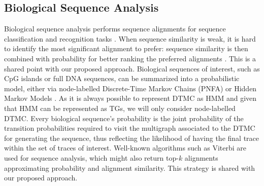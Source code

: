 

\subsection{Biological Sequence Analysis}
Biological sequence analysis performs sequence alignments for sequence classification and recognition tasks \cite{durbin1998biological}. When sequence similarity is weak, it is hard to identify the most significant alignment to prefer: sequence similarity is then combined with probability for better ranking the preferred alignments \cite{durbin1998biological}. This is a shared point with our proposed approach. 
%
Biological sequences of interest, such as CpG islands or full DNA sequences, can be summarized into a probabilistic model, either via node-labelled Discrete-Time Markov Chains (PNFA) \cite{RyabkoU08} or Hidden Markov Models \cite{Helske2018}. As it is always possible to represent DTMC as HMM \cite{DUPONT20051349} and given that HMM can be represented as TGs, we will only consider node-labelled DTMC. %
Every biological sequence's probability is the joint probability of the transition probabilities required to visit the multigraph associated to the DTMC for generating the sequence, thus %
reflecting the likelihood of having the final trace within the set of traces of interest. 
%
Well-known algorithms such as Viterbi are used for sequence analysis, which might also return top-$k$ alignments approximating probability and alignment similarity.
This strategy is shared with our proposed approach. 
